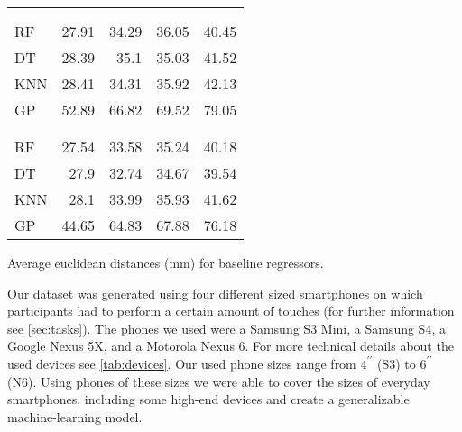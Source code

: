 \begin{margintable}
\begin{tabularx}{1\marginparwidth}{Xd{2.1}d{2.1}d{1.1}d{1.1}}
		&&    
		 &
		 &
		 \\
		\\
		\midrule
		RF & 27.91 & 34.29  & 36.05  & 40.45 \\ 
		DT & 28.39 & 35.1   & 35.03  & 41.52 \\ 
		KNN& 28.41 & 34.31  & 35.92  & 42.13 \\ 
		GP & 52.89 & 66.82  & 69.52  & 79.05 \\ 
		\midrule
		&&    
		 &
		 &
		\\
		\\
		\midrule
		RF &27.54 & 33.58  & 35.24  & 40.18 \\ 
		DT &27.9  & 32.74  & 34.67  & 39.54 \\ 
		KNN&28.1  & 33.99  & 35.93  & 41.62 \\ 
		GP &44.65 & 64.83  & 67.88  & 76.18 \\ 
		\bottomrule
	\end{tabularx}%
	\caption[Baseline data]{\small Average euclidean distances (mm) for baseline regressors.}
	\label{tab:baseline}
\end{margintable}

Our dataset was generated using four different sized smartphones on which participants had to perform a certain amount of touches (for further information see \cref{sec:tasks}).
The phones we used were a Samsung S3 Mini, a Samsung S4, a Google Nexus 5X, and a Motorola Nexus 6.
For more technical details about the used devices see \cref{tab:devices}.
Our used phone sizes range from $ 4^{\prime\prime} $ (S3) to $ 6^{\prime\prime} $ (N6). 
Using phones of these sizes we were able to cover the sizes of everyday smartphones, including some high-end devices and create a generalizable machine-learning model.



